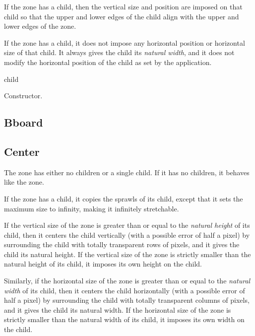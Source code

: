 If the  zone has a child, then the vertical size and
position are imposed on that child so that the upper and lower edges of
the child align with the upper and lower edges of the 
zone.  

If the  zone has a child, it does not impose any horizontal
position or horizontal size of that child.  It always gives the child
its \emph{natural width}, and it does not modify the horizontal
position of the child as set by the application.


 {\optional child}

Constructor. 

\subsection{Bboard}



\subsection{Center}

The  zone has either no children or a single child.  If
it has no children, it behaves like the  zone.

If the  zone has a child, it copies the sprawls of its
child, except that it sets the maximum size to infinity, making it
infinitely stretchable.  

If the vertical size of the  zone is greater than or
equal to the \emph{natural height} of its child, then it centers the
child vertically (with a possible error of half a pixel) by
surrounding the child with totally transparent rows of pixels, and it
gives the child its natural height.  If the vertical size of
the  zone is strictly smaller than the natural height of
its child, it imposes its own height on the child.

Similarly, if the horizontal size of the  zone is greater than or
equal to the \emph{natural width} of its child, then it centers the
child horizontally (with a possible error of half a pixel) by
surrounding the child with totally transparent columns of pixels, and it
gives the child its natural width.  If the horizontal size of
the  zone is strictly smaller than the natural width of
its child, it imposes its own width on the child.

